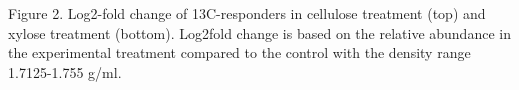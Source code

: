 Figure 2. Log2-fold change of 13C-responders in cellulose treatment (top) and xylose treatment (bottom). Log2fold change is based on the relative abundance in the experimental treatment compared to the control with the density range 1.7125-1.755 g/ml.  